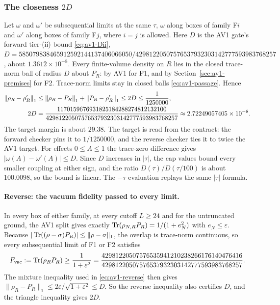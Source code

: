 \subsubsection{The closeness \texorpdfstring{$2D$}{2D}}
\label{sec:ay1-closeness}
Let $\omega$ and $\omega'$ be subsequential limits at the same $\tau$,
$\omega$ along boxes of family F$i$ and $\omega'$ along boxes of family F$j$,
where $i=j$ is allowed. Here $D$ is the AV1 gate's forward tier-(ii) bound
\eqref{eq:av1-Dii},
$D=585079838465912592144137406066050/42981220507576537932303142777593983768257$,
about $1.3612\times10^{-8}$. Every finite-volume density on $R$ lies in the
closed trace-norm ball of radius $D$ about $P_R$: by AV1 for F1, and by
Section~\ref{sec:ay1-premises} for F2. Trace-norm limits stay in closed balls
\eqref{eq:av1-passage}. Hence
\begin{equation}
 \begin{aligned}
 \left\lVert\rho_R-\rho'_R\right\rVert_1&\le\left\lVert\rho_R-P_R\right\rVert_1+\left\lVert P_R-\rho'_R\right\rVert_1
 \le2D\le\frac1{1250000},\\
 2D&=\frac{1170159676931825184288274812132100}{42981220507576537932303142777593983768257}
 \approx2.72249057405\times10^{-8}.
 \end{aligned}
 \label{eq:ay1-2D}
\end{equation}
The target margin is about $29.38$. The target is read from the contract:
the forward checker pins it to $1/1250000$, and the reverse checker ties it to
twice the AV1 target. For effects $0\le A\le1$ the trace-zero difference gives
$|\omega(A)-\omega'(A)|\le D$. Since $D$ increases in $|\tau|$, the cap values
bound every smaller coupling at either sign, and the ratio
$D(\tau)/D(\tau/100)$ is about $100.0098$, so the bound is linear. The $-\tau$
evaluation replays the same $|\tau|$ formula.

\paragraph{Reverse: the vacuum fidelity passed to every limit.}
In every box of either family, at every cutoff $L\ge24$ and for the
untruncated ground, the AV1 split gives exactly
$\operatorname{Tr}(\rho_{N,R}P_R)=1/(1+e_N^2)$ with $e_N\le\varepsilon$. Because
$|\operatorname{Tr}((\rho-\sigma)P_R)|\le\lVert \rho-\sigma\rVert_1$, the overlap is trace-norm
continuous, so every subsequential limit of F1 or F2 satisfies
\begin{equation}
 F_{\rm vac}:=\operatorname{Tr}(\rho_RP_R)\ge\frac1{1+\varepsilon^2}
 =\frac{42981220507576535941210238266176140476416}{42981220507576537932303142777593983768257}.
 \label{eq:ay1-fidelity}
\end{equation}
The mixture inequality used in \eqref{eq:av1-reverse} then gives
$\lVert \rho_R-P_R\rVert_1\le2\varepsilon/\sqrt{1+\varepsilon^2}\le D$. So the
reverse inequality also certifies $D$, and the triangle inequality gives $2D$.

